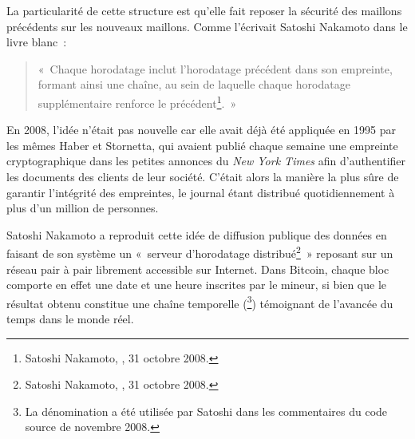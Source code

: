 La particularité de cette structure est qu'elle fait reposer la sécurité des maillons précédents sur les nouveaux maillons. Comme l'écrivait Satoshi Nakamoto dans le livre blanc~: 

\begin{quote}
«~Chaque horodatage inclut l'horodatage précédent dans son empreinte, formant ainsi une chaîne, au sein de laquelle chaque horodatage supplémentaire renforce le précédent\footnote{Satoshi Nakamoto, , 31 octobre 2008.}.~»
\end{quote}

En 2008, l'idée n'était pas nouvelle car elle avait déjà été appliquée en 1995 par les mêmes Haber et Stornetta, qui avaient publié chaque semaine une empreinte cryptographique dans les petites annonces du \emph{New York Times} afin d'authentifier les documents des clients de leur société. C'était alors la manière la plus sûre de garantir l'intégrité des empreintes, le journal étant distribué quotidiennement à plus d'un million de personnes.


Satoshi Nakamoto a reproduit cette idée de diffusion publique des données en faisant de son système un «~serveur d'horodatage distribué\footnote{Satoshi Nakamoto, , 31 octobre 2008.}~» reposant sur un réseau pair à pair librement accessible sur Internet. Dans Bitcoin, chaque bloc comporte en effet une date et une heure inscrites par le mineur, si bien que le résultat obtenu constitue une chaîne temporelle (\footnote{La dénomination  a été utilisée par Satoshi dans les commentaires du code source de novembre 2008.}) témoignant de l'avancée du temps dans le monde réel.

